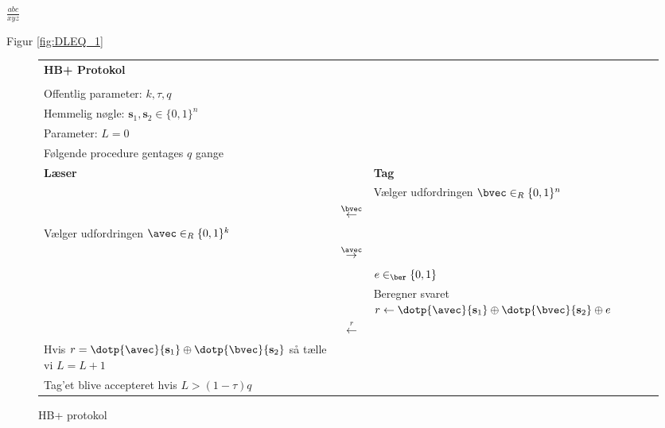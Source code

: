 \documentclass{article}
\newcommand{\svec}{\ensuremath{\mathbf{s}}\xspace}
\begin{document}
\begin{math}
\frac{abc}{xyz}
 \end{math}    
 

Figur \ref{fig:DLEQ_1}


 
 
\begin{figure}[H]
	\begin{center}
 	\begin{tabular}{ l c r }
		\bf{HB+ Protokol} \\
		\\
		Offentlig parameter: $k, \tau, q$ \\
		Hemmelig nøgle: $\svec_1, \svec_2 \in \{0,1\}^n$ \\
		Parameter: $L = 0$ \\
		Følgende procedure gentages $q$ gange \\
		\hline
		\bf{Læser} & & \multicolumn{1}{l}{\bf{Tag}} \\
		& & \multicolumn{1}{l}{Vælger udfordringen $\bvec \in_R \{0,1\}^n$} \\
		& $\overset{\bvec}{\leftarrow}$ & \\
		Vælger udfordringen $\avec \in_R \{0,1\}^k$ & & \\
		& $\overset{\avec}{\rightarrow}$ & \\
		& & \multicolumn{1}{l}{$e \in_{\ber} \{0,1\}$} \\
		& & \multicolumn{1}{l}{Beregner svaret $r \leftarrow \dotp{\avec}{\svec_1} \oplus \dotp{\bvec}{\svec_2} \oplus e$ } \\
		& $\overset{r}{\leftarrow}$ &  \\
		Hvis $r = \dotp{\avec}{\svec_1} \oplus \dotp{\bvec}{\svec_2}$ så tælle vi $L = L + 1$ & & \\
		\hline
		Tag'et blive accepteret hvis $L > (1-\tau)q$ & &
	\end{tabular}
	\end{center}
	\caption{HB+ protokol}
	\label{fig:HB+}
\end{figure} 
\end{document}
